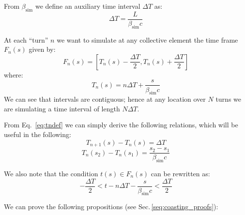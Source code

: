 From $\beta_\text{sim}$ we define an auxiliary time interval $\Delta T$ as:
\begin{equation}
\Delta T = \frac{L}{\beta_\text{sim}c}
\label{eq:deltatdef}
\end{equation}


At each ``turn'' $n$ we want to simulate at any  collective element the time frame $F_n(s) $ given by:
\begin{equation}
F_n(s) = \left[ T_n(s) - \frac{\Delta T}{2}, T_n(s) + \frac{\Delta T}{2} \right]
\label{eq:framedef}
\end{equation}
where:
\begin{equation}
T_n(s) = n \Delta T + \frac{s}{\beta_\text{sim} c}
\label{eq:tndef}
\end{equation}
We can see that intervals are contiguous; hence at any location over $N$ turns we are simulating a time interval of length $N \Delta T$.

From Eq.~\ref{eq:tndef} we can simply derive the following relations, which will be useful in the following:
\begin{equation}
T_{n+1}(s) - T_{n}(s)  = \Delta T
\label{eq:tniter}
\end{equation}
\begin{equation}
T_{n}(s_2) - T_{n}(s_1)  = \frac{s_2 - s_1}{\beta_\text{sim} c}
\label{eq:frametransport}
\end{equation}

We also note that the condition $t(s) \in F_n(s)$ can be rewritten as:
\begin{equation}
- \frac{\Delta T}{2} < t - n \Delta T - \frac{s}{\beta_\text{sim} c} < \frac{\Delta T}{2}
\label{eq:frameineq}
\end{equation}


We can prove the following propositions (see Sec.\,\ref{seq:coasting_proofs}):

